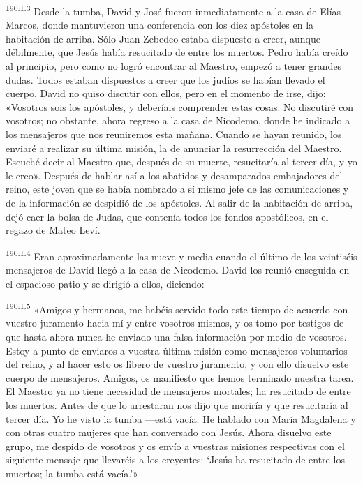 \par 
\textsuperscript{190:1.3} Desde la tumba, David y José fueron inmediatamente a la casa de Elías Marcos, donde mantuvieron una conferencia con los diez apóstoles en la habitación de arriba. Sólo Juan Zebedeo estaba dispuesto a creer, aunque débilmente, que Jesús había resucitado de entre los muertos. Pedro había creído al principio, pero como no logró encontrar al Maestro, empezó a tener grandes dudas. Todos estaban dispuestos a creer que los judíos se habían llevado el cuerpo. David no quiso discutir con ellos, pero en el momento de irse, dijo: «Vosotros sois los apóstoles, y deberíais comprender estas cosas. No discutiré con vosotros; no obstante, ahora regreso a la casa de Nicodemo, donde he indicado a los mensajeros que nos reuniremos esta mañana. Cuando se hayan reunido, los enviaré a realizar su última misión, la de anunciar la resurrección del Maestro. Escuché decir al Maestro que, después de su muerte, resucitaría al tercer día, y yo le creo». Después de hablar así a los abatidos y desamparados embajadores del reino, este joven que se había nombrado a sí mismo jefe de las comunicaciones y de la información se despidió de los apóstoles. Al salir de la habitación de arriba, dejó caer la bolsa de Judas, que contenía todos los fondos apostólicos, en el regazo de Mateo Leví.

\par 
\textsuperscript{190:1.4} Eran aproximadamente las nueve y media cuando el último de los veintiséis mensajeros de David llegó a la casa de Nicodemo. David los reunió enseguida en el espacioso patio y se dirigió a ellos, diciendo:

\par 
\textsuperscript{190:1.5} «Amigos y hermanos, me habéis servido todo este tiempo de acuerdo con vuestro juramento hacia mí y entre vosotros mismos, y os tomo por testigos de que hasta ahora nunca he enviado una falsa información por medio de vosotros. Estoy a punto de enviaros a vuestra última misión como mensajeros voluntarios del reino, y al hacer esto os libero de vuestro juramento, y con ello disuelvo este cuerpo de mensajeros. Amigos, os manifiesto que hemos terminado nuestra tarea. El Maestro ya no tiene necesidad de mensajeros mortales; ha resucitado de entre los muertos. Antes de que lo arrestaran nos dijo que moriría y que resucitaría al tercer día. Yo he visto la tumba ---está vacía. He hablado con María Magdalena y con otras cuatro mujeres que han conversado con Jesús. Ahora disuelvo este grupo, me despido de vosotros y os envío a vuestras misiones respectivas con el siguiente mensaje que llevaréis a los creyentes: `Jesús ha resucitado de entre los muertos; la tumba está vacía.'»

